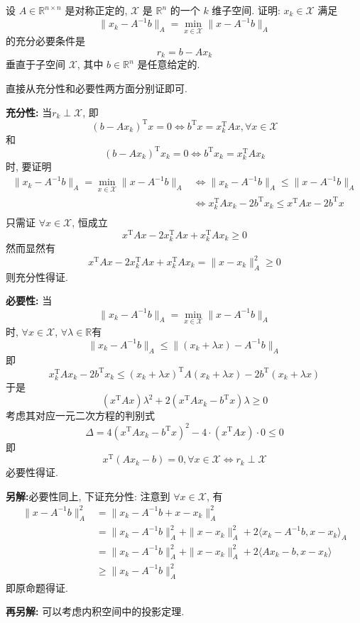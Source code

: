 \documentclass[12pt, answers]{exam}     %
\newcommand{\anothersolution}{\par\noindent\textbf{另解:}}
\newcommand{\R}{\mathbb{R}}
\newcommand{\T}{\mathrm{T}}
\begin{document}
\begin{questions}
\question{}设 \( A \in \R^{n \times n} \) 是对称正定的, \( \mathcal{X} \) 是 \( \R^n \) 的一个 \( k \) 维子空间. 证明:   
\( x_k \in \mathcal{X} \)  
满足  
\[ \| x_k - A^{-1} b \|_A = \min_{x \in \mathcal{X}} \| x - A^{-1} b \|_A \]  
的充分必要条件是  
\[ r_k = b - A x_k \]  
垂直于子空间 \( \mathcal{X} \), 其中 \( b \in \R^n \) 是任意给定的. 

\begin{solution}
直接从充分性和必要性两方面分别证即可. 

\textbf{充分性:}
当\( r_k \perp \mathcal{X} \), 即
\[
(b - A x_k)^{\T} x = 0 \Leftrightarrow b^{\T}x = x_k^{\T} A x, \forall x \in \mathcal{X}
\]
和
\[
(b - A x_k)^{\T} x_k = 0 \Leftrightarrow b^{\T}x_k = x_k^{\T} A x_k
\]
时, 要证明
\begin{align*}
\| x_k - A^{-1} b \|_A = \min_{x \in \mathcal{X}} \| x - A^{-1} b \|_A &\Leftrightarrow \| x_k - A^{-1} b \|_A \leq \| x - A^{-1} b \|_A   \\
&\Leftrightarrow x_k^{\T} A x_k - 2 b^{\T} x_k \leq x^{\T} A x - 2 b^{\T} x \\
\end{align*}
只需证 \( \forall x \in \mathcal{X} \), 恒成立
\[
x^{\T} A x - 2 x_k^{\T} A x + x_k^{\T} A x_k \geq 0
\]
然而显然有
\[
x^{\T} A x - 2 x_k^{\T} A x + x_k^{\T} A x_k = \|x - x_k\|_{A}^2 \geq 0
\]
则充分性得证. 

\textbf{必要性:}
当
\[
\| x_k - A^{-1} b \|_A = \min_{x \in \mathcal{X}} \| x - A^{-1} b \|_A
\]
时, \( \forall x \in \mathcal{X} \), \( \forall \lambda \in \R \)有
\[
\| x_k - A^{-1} b \|_A \leq \| (x_k + \lambda x) - A^{-1} b \|_A 
\]
即
\[
x_k^{\T} A x_k - 2 b^{\T} x_k \leq (x_k + \lambda x)^{\T} A (x_k + \lambda x) - 2 b^{\T} (x_k + \lambda x)
\]
于是
\[
(x^{\T} A x) \lambda^2 + 2 (x^{\T} A x_k - b^{\T} x) \lambda \geq 0
\]
考虑其对应一元二次方程的判别式
\[
\Delta = 4 (x^{\T} A x_k- b^{\T} x)^2 - 4 \cdot (x^{\T} A x) \cdot 0 \leq 0
\]  
即
\[
x^{\T}(Ax_k-b) = 0, \forall x \in \mathcal{X} \Leftrightarrow r_k \perp \mathcal{X}
\]
必要性得证. 

\anothersolution{}必要性同上, 下证充分性: 注意到 \( \forall x \in \mathcal{X} \), 有
\begin{align*}
\| x - A^{-1} b \|_A^2 &= \| x_k - A^{-1} b + x - x_k \|_A^2   \\
&= \| x_k - A^{-1} b \|_A^2 + \| x - x_k \|_A^2 + 2 \langle x_k - A^{-1} b, x - x_k\rangle_A  \\
&= \| x_k - A^{-1} b \|_A^2 + \| x - x_k \|_A^2 + 2 \langle Ax_k - b, x - x_k\rangle  \\
&\geq \| x_k - A^{-1} b \|_A^2
\end{align*}
即原命题得证. 

\textbf{再另解: }可以考虑内积空间中的投影定理.
\end{solution}



\end{questions}
\end{document}

